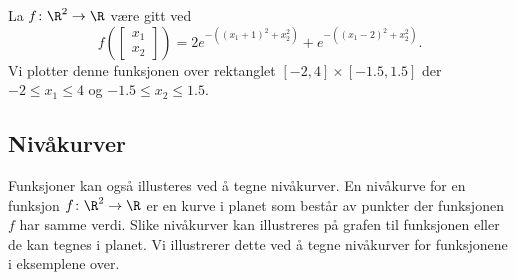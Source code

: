 \begin{eksempel}
  La $f \colon \R^2 \to \R$ være gitt ved
  $$f(\begin{bmatrix} x_1 \\ x_2 \end{bmatrix}) =
  2e^{-((x_1 + 1)^2 + x_2^2)}
  +
  e^{-((x_1 - 2)^2 + x_2^2)}
  .$$
  Vi plotter denne funksjonen over rektanglet $[-2,4] \times [-1.5, 1.5]$
  der $-2 \le x_1 \le 4$ og $-1.5 \le x_2 \le 1.5$.
\end{eksempel}

\subsection{Nivåkurver}
Funksjoner kan også illusteres ved å tegne nivåkurver. En nivåkurve for en
funksjon $f \colon \R^2 \to \R$ er en kurve i planet som består av punkter
der funksjonen $f$ har samme verdi. Slike nivåkurver kan illustreres på grafen til 
funksjonen eller de kan tegnes i planet.
Vi illustrerer dette ved å tegne nivåkurver for funksjonene i eksemplene over.



  
